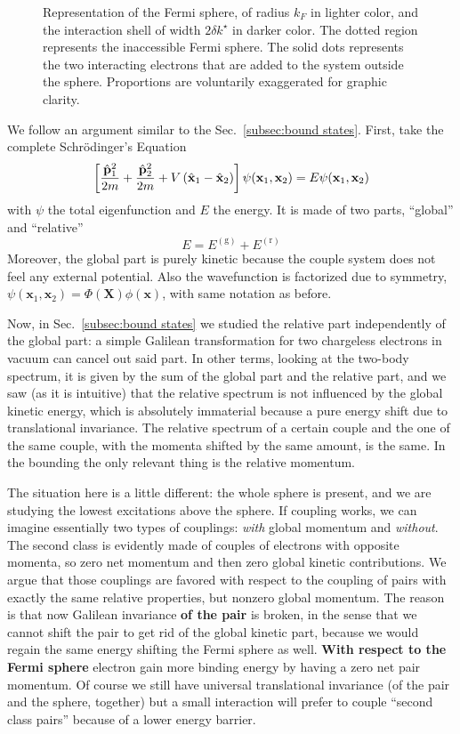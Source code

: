 \begin{figure}
	\centering
	
	\caption{Representation of the Fermi sphere, of radius $k_F$ in lighter color, and the interaction shell of width $2\delta k^\star$ in darker color. The dotted region represents the inaccessible Fermi sphere. The solid dots represents the two interacting electrons that are added to the system outside the sphere. Proportions are voluntarily exaggerated for graphic clarity.}
	\label{fig:fermi sphere and shell}
\end{figure}

We follow an argument similar to the Sec.~\ref{subsec:bound states}. First, take the complete Schrödinger's Equation
\[
	\left[{\frac{\hat{\mathbf{p}}_1^2}{2m} + \frac{\hat{\mathbf{p}}_2^2}{2m} + V \left({\hat{\mathbf{x}}_1 - \hat{\mathbf{x}}_2}\right)}\right] \psi(\mathbf{x}_1,\mathbf{x}_2) = E \psi(\mathbf{x}_1,\mathbf{x}_2)
\]
with $\psi$ the total eigenfunction and $E$ the energy. It is made of two parts, ``global'' and ``relative''
\[
	E = E^{(\mathrm{g})} + E^{(\mathrm{r})}
\]
Moreover, the global part is purely kinetic because the couple system does not feel any external potential. Also the wavefunction is factorized due to symmetry, $\psi(\mathbf{x}_1,\mathbf{x}_2) = \Phi(\mathbf{X}) \phi(\mathbf{x})$, with same notation as before.

Now, in Sec.~\ref{subsec:bound states} we studied the relative part independently of the global part: a simple Galilean transformation for two chargeless electrons in vacuum can cancel out said part. In other terms, looking at the two-body spectrum, it is given by the sum of the global part and the relative part, and we saw (as it is intuitive) that the relative spectrum is not influenced by the global kinetic energy, which is absolutely immaterial because a pure energy shift due to translational invariance. The relative spectrum of a certain couple and the one of the same couple, with the momenta shifted by the same amount, is the same. In the bounding the only relevant thing is the relative momentum.

The situation here is a little different: the whole sphere is present, and we are studying the lowest excitations above the sphere. If coupling works, we can imagine essentially two types of couplings: \textit{with} global momentum and \textit{without}. The second class is evidently made of couples of electrons with opposite momenta, so zero net momentum and then zero global kinetic contributions. We argue that those couplings are favored with respect to the coupling of pairs with exactly the same relative properties, but nonzero global momentum. The reason is that now Galilean invariance \textbf{of the pair} is broken, in the sense that we cannot shift the pair to get rid of the global kinetic part, because we would regain the same energy shifting the Fermi sphere as well. \textbf{With respect to the Fermi sphere} electron gain more binding energy by having a zero net pair momentum. Of course we still have universal translational invariance (of the pair and the sphere, together) but a small interaction will prefer to couple ``second class pairs'' because of a lower energy barrier.

